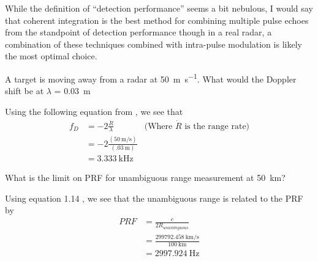 \documentclass[12pt]{article}
\newenvironment{exercise}[2][Exercise]{\begin{trivlist}
    \item[\hskip \labelsep {\bfseries #1}\hskip \labelsep {\bfseries #2.}]}{\end{trivlist}}
\begin{document}
\begin{exercise}{9}
      While the definition of ``detection performance'' seems a bit nebulous, I would say that coherent integration is the best method for combining multiple pulse echoes from the standpoint of detection performance though in a real radar, a combination of these techniques combined with intra-pulse modulation is likely the most optimal choice.
      \end{exercise}
      
      \begin{exercise}{10}
      A target is moving away from a radar at \SI{50}{\meter\per\second}. What would the Doppler shift be at $\lambda$ = \SI{.03}{\meter}

      Using the following equation from \cite[p.~261]{POMR}, we see that
      \begin{align*}
      f_{D} & = -2\frac{\dot{R}}{\lambda} & \text{(Where $\dot{R}$ is the range rate)}\\
      & = -2\frac{ (\SI{50}{\meter\per\second}) }{ (\SI{.03}{\meter}) }\\
      & = \SI{3.333}{\kHz}
      \end{align*}
      \end{exercise}
      
      \begin{exercise}{11}
      What is the limit on PRF for unambiguous range measurement at \SI{50}{\km}?

      Using equation 1.14 \cite[p.~22]{POMR}, we see that the unambiguous range is related to the PRF by
      \begin{align*}
      PRF & = \frac{c}{2 R_{unambiguous}}\\
      & = \frac{\SI{299792.458}{\km\per\second}}{\SI{100}{\km}}\\
      & = \SI{2997.924}{\Hz}
      \end{align*}
      \end{exercise}
      
\end{document}
